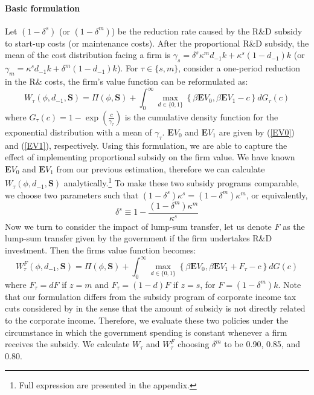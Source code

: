 \documentclass[English]{article}
\begin{document}
\paragraph{Basic formulation}

Let $(1-\delta ^s)$ (or $(1-\delta ^m)$) be the reduction rate caused by the R\&D subsidy to start-up costs (or maintenance costs). After the proportional R\&D subsidy, the mean of the cost distribution facing a firm is $\gamma_{s}=\delta^s\kappa^m d_{-1} k+\kappa^s(1- d_{-1}) k$ (or $\gamma_{m}=\kappa^s d_{-1} k+\delta^m (1-d_{-1}) k$). For $\tau\in\{s,m\}$, consider a one-period reduction in the R\& costs, the firm's value function can be reformulated as:
\begin{equation}\label{wz}  
W_{\tau}(\phi, d_{-1}, \mathbf{S})=\Pi(\phi,\mathbf{S})+ \int_0^{\infty}\max_{d\in\{0,1\}}\left\{\beta \mathbf{E}V_{0},  \beta \mathbf{E}V_{1}-c\right\}dG_\tau(c)
\end{equation}
where $G_\tau(c)=1-\exp(\frac{c}{\gamma_{\tau}})$ is the cumulative density function for the exponential distribution with a mean of $\gamma_{\tau}$. $\mathbf{E}V_{0}$ and  $\mathbf{E}V_1$ are given by (\ref{EV0}) and (\ref{EV1}), respectively. Using this formulation, we are able to capture the effect of implementing proportional subsidy on the firm value. We have known $\mathbf{E}V_{0}$ and  $\mathbf{E}V_1$ from our previous estimation, therefore we can calculate $W_{\tau}(\phi, d_{-1}, \mathbf{S})$ analytically.\footnote{Full expression are presented in the appendix.} To make these two subsidy programs comparable, we choose two parameters such that $(1-\delta^s)\kappa^s=(1-\delta^m)\kappa^m$, or equivalently, 
\begin{equation}
\delta^s\equiv 1-\frac{(1-\delta^m)\kappa^m}{\kappa^s}
\end{equation}
Now we turn to consider the impact of lump-sum transfer, let us denote $F$ as the lump-sum transfer given by the government if the firm undertakes R\&D investment. Then the firms value function becomes:
\begin{equation}\label{wzf}
W_{\tau}^F(\phi, d_{-1}, \mathbf{S})=\Pi(\phi,\mathbf{S})+ \int_0^{\infty}\max_{d\in\{0,1\}}\left\{\beta \mathbf{E}V_{0},  \beta \mathbf{E}V_{1}+F_\tau-c\right\}dG(c)
\end{equation}
where $F_\tau=dF$ if $z=m$ and $F_\tau=(1-d)F$ if $z=s$, for $F=(1-\delta^m) k$.
Note that our formulation differs from the subsidy program of corporate income tax cuts considered by \citet{chen2017} in the sense that the amount of subsidy is not directly related to the corporate income. Therefore, we evaluate these two policies under the circumstance in which the government spending is constant whenever a firm receives the subsidy. We calculate $W_\tau$ and $W_{\tau}^F$ choosing $\delta^m$ to be 0.90, 0.85, and 0.80.
\end{document}
